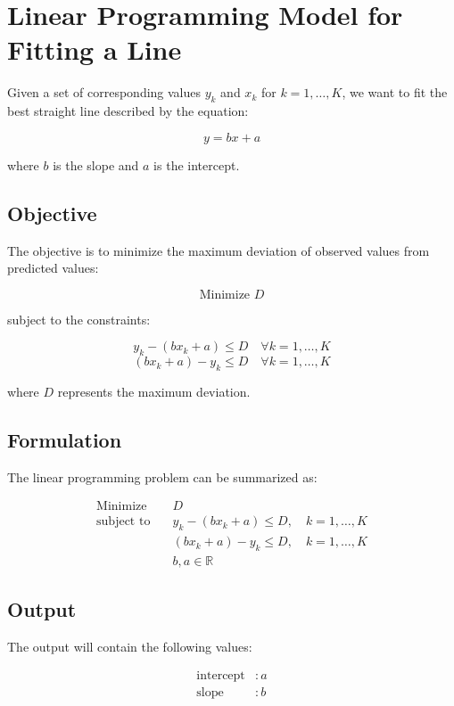 \documentclass{article}
\begin{document}
\section*{Linear Programming Model for Fitting a Line}

Given a set of corresponding values \( y_k \) and \( x_k \) for \( k = 1, \ldots, K \), we want to fit the best straight line described by the equation:

\[
y = bx + a
\]

where \( b \) is the slope and \( a \) is the intercept.

\subsection*{Objective}

The objective is to minimize the maximum deviation of observed values from predicted values:

\[
\text{Minimize } D
\]

subject to the constraints:

\[
y_k - (bx_k + a) \leq D \quad \forall k = 1, \ldots, K
\]
\[
(bx_k + a) - y_k \leq D \quad \forall k = 1, \ldots, K
\]

where \( D \) represents the maximum deviation.

\subsection*{Formulation}

The linear programming problem can be summarized as:

\begin{align*}
\text{Minimize} & \quad D \\
\text{subject to} & \quad y_k - (bx_k + a) \leq D, \quad k = 1, \ldots, K \\
                  & \quad (bx_k + a) - y_k \leq D, \quad k = 1, \ldots, K \\
                  & \quad b, a \in \mathbb{R}
\end{align*}

\subsection*{Output}

The output will contain the following values:

\begin{align*}
\text{intercept} & : a \\
\text{slope} & : b
\end{align*}
\end{document}
